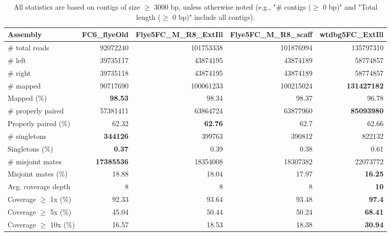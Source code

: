 \documentclass[12pt,a4paper]{article}
\begin{document}
\begin{table}[ht]
\begin{center}
\caption{All statistics are based on contigs of size $\geq$ 3000 bp, unless otherwise noted (e.g., "\# contigs ($\geq$ 0 bp)" and "Total length ($\geq$ 0 bp)" include all contigs).}
\begin{tabular}{|l*{4}{|r}|}
\hline
Assembly & FC6\_flyeOld & Flye5FC\_M\_R8\_ExtIll & Flye5FC\_M\_R8\_scaff & wtdbg5FC\_ExtIll \\ \hline
\# total reads & 92072240 & 101753338 & 101876994 & 135797310 \\ \hline
\# left & 39735117 & 43874195 & 43874189 & 58774857 \\ \hline
\# right & 39735118 & 43874195 & 43874189 & 58774857 \\ \hline
\# mapped & 90717690 & 100061233 & 100215024 & {\bf 131427182} \\ \hline
Mapped (\%) & {\bf 98.53} & 98.34 & 98.37 & 96.78 \\ \hline
\# properly paired & 57381411 & 63864724 & 63877960 & {\bf 85093980} \\ \hline
Properly paired (\%) & 62.32 & {\bf 62.76} & 62.7 & 62.66 \\ \hline
\# singletons & {\bf 344126} & 399763 & 390812 & 822132 \\ \hline
Singletons (\%) & {\bf 0.37} & 0.39 & 0.38 & 0.61 \\ \hline
\# misjoint mates & {\bf 17385536} & 18354008 & 18307382 & 22073772 \\ \hline
Misjoint mates (\%) & 18.88 & 18.04 & 17.97 & {\bf 16.25} \\ \hline
Avg. coverage depth & 8 & 8 & 8 & {\bf 10} \\ \hline
Coverage $\geq$ 1x (\%) & 92.33 & 93.64 & 93.48 & {\bf 97.4} \\ \hline
Coverage $\geq$ 5x (\%) & 45.04 & 50.44 & 50.24 & {\bf 68.41} \\ \hline
Coverage $\geq$ 10x (\%) & 16.57 & 18.53 & 18.38 & {\bf 30.94} \\ \hline
\end{tabular}
\end{center}
\end{table}
\end{document}
